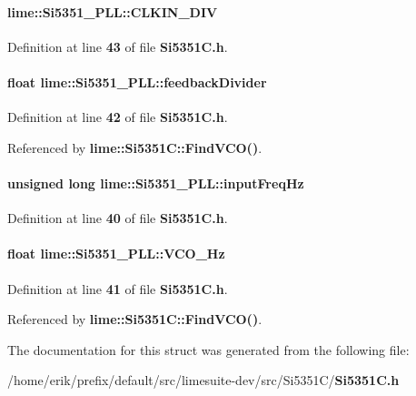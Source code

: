 \paragraph[{C\+L\+K\+I\+N\+\_\+\+D\+IV}]{ lime\+::\+Si5351\+\_\+\+P\+L\+L\+::\+C\+L\+K\+I\+N\+\_\+\+D\+IV}\label{structlime_1_1Si5351__PLL_a0decc56c354baa4b183b7ac298dfc14c}


Definition at line {\bf 43} of file {\bf Si5351\+C.\+h}.

\paragraph[{feedback\+Divider}]{\setlength{\rightskip}{0pt plus 5cm}float lime\+::\+Si5351\+\_\+\+P\+L\+L\+::feedback\+Divider}\label{structlime_1_1Si5351__PLL_af34d5298a12affffc43826bd03257b11}


Definition at line {\bf 42} of file {\bf Si5351\+C.\+h}.



Referenced by {\bf lime\+::\+Si5351\+C\+::\+Find\+V\+C\+O()}.

\paragraph[{input\+Freq\+Hz}]{\setlength{\rightskip}{0pt plus 5cm}unsigned long lime\+::\+Si5351\+\_\+\+P\+L\+L\+::input\+Freq\+Hz}\label{structlime_1_1Si5351__PLL_ab37eea4b96ab94f85e60bf6ae59e1a1b}


Definition at line {\bf 40} of file {\bf Si5351\+C.\+h}.

\paragraph[{V\+C\+O\+\_\+\+Hz}]{\setlength{\rightskip}{0pt plus 5cm}float lime\+::\+Si5351\+\_\+\+P\+L\+L\+::\+V\+C\+O\+\_\+\+Hz}\label{structlime_1_1Si5351__PLL_af8d4e8a9ff4b388cc5e02b6a26d84faf}


Definition at line {\bf 41} of file {\bf Si5351\+C.\+h}.



Referenced by {\bf lime\+::\+Si5351\+C\+::\+Find\+V\+C\+O()}.



The documentation for this struct was generated from the following file\+:\begin{DoxyCompactItemize}
\item 
/home/erik/prefix/default/src/limesuite-\/dev/src/\+Si5351\+C/{\bf Si5351\+C.\+h}\end{DoxyCompactItemize}

